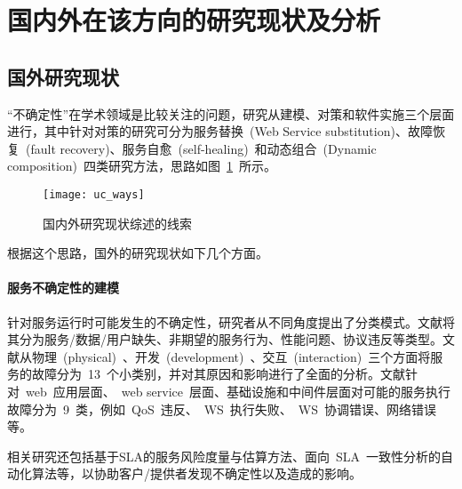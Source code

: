 \section{国内外在该方向的研究现状及分析}
\subsection{国外研究现状}

“不确定性”在学术领域是比较关注的问题，研究从建模、对策和软件实施三个层面进行，其中针对对策的研究可分为服务替换~(Web Service substitution)、故障恢复~(fault recovery)、服务自愈~(self-healing)~和动态组合~(Dynamic composition)~四类研究方法，思路如图~\ref{uc_ways}~所示。

\begin{figure}[htbp]
\centering
\texttt{[image: uc\_ways]}
\caption{国内外研究现状综述的线索}\label{uc_ways}
\vspace{-1em}
\end{figure}

根据这个思路，国外的研究现状如下几个方面。

\setcounter{paragraph}{0}
\paragraph{服务不确定性的建模}


针对服务运行时可能发生的不确定性，研究者从不同角度提出了分类模式。文献\cite{kokash2007evaluating}将其分为服务/数据/用户缺失、非期望的服务行为、性能问题、协议违反等类型。文献\cite{chan2009fault}从物理~(physical)~、开发~(development)~、交互~(interaction)~三个方面将服务的故障分为~13~个小类别，并对其原因和影响进行了全面的分析。文献针对~web~应用层面、~web service~层面、基础设施和中间件层面对可能的服务执行故障分为~9~类，例如~QoS~违反、~WS~执行失败、~WS~协调错误、网络错误等。

相关研究还包括基于SLA的服务风险度量与估算方法、面向~SLA~一致性分析的自动化算法等，以协助客户/提供者发现不确定性以及造成的影响。

